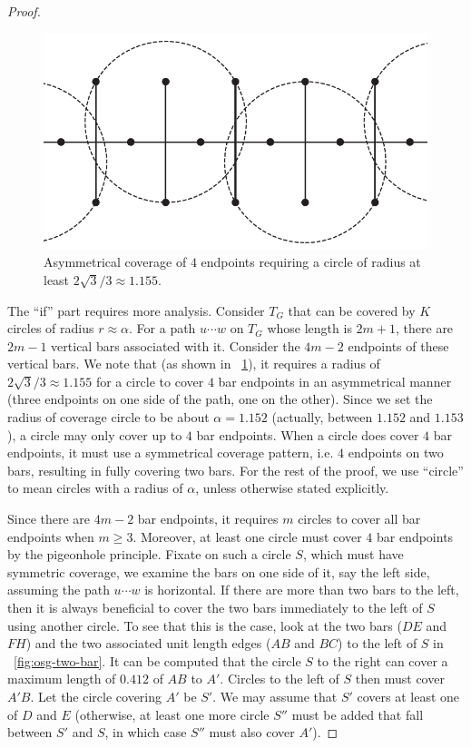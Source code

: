\begin{proof}
  \begin{figure}[!ht]
    \centering
    \includegraphics[scale=0.33]{chapters/osg/figures/edgepath3-eps-converted-to.pdf}
  \vspace*{1mm}
    \caption[Asymmetrical coverage of $4$ endpoints]{Asymmetrical coverage of $4$ endpoints requiring a circle of 
    radius at least $2\sqrt{3}/3\approx 1.155$.}
    \label{fig:osg-pathcovert}
  \end{figure}

The ``if'' part requires more analysis. Consider $T_G$ that can be covered 
by $K$ circles of radius $r \approx \alpha$. For a path $u\cdots w$ on $T_G$ whose 
length is $2m+1$, there are $2m-1$ vertical bars associated with it. Consider 
the $4m-2$ endpoints of these vertical bars. We note that (as shown in 
~\ref{fig:osg-pathcovert}), it requires a radius of $2\sqrt{3}/3\approx 1.155$ 
for a circle to cover $4$ bar endpoints in an asymmetrical manner (three endpoints
on one side of the path, one on the other). Since 
we set the radius of coverage circle to be about $\alpha = 1.152$ (actually, 
between $1.152$ and $1.153$),
a circle may only cover up to $4$ bar endpoints. When a circle does cover $4$ 
bar endpoints, it must use a symmetrical coverage pattern, i.e. $4$ endpoints
on two bars, resulting in fully covering two bars. For the 
rest of the proof, we use ``circle'' to mean circles with a radius of $\alpha$,
unless otherwise stated explicitly. 

Since there are $4m - 2$ bar endpoints, it requires $m$ circles to cover all 
bar endpoints when $m \ge 3$. Moreover, at least one circle must cover $4$ 
bar endpoints by the pigeonhole principle. Fixate on such a circle $S$, which 
must have symmetric coverage, we examine the bars on one side of it, say the 
left side, assuming the path $u\cdots w$ is horizontal. If there are more 
than two bars to the left, then it is always beneficial to cover the two bars 
immediately to the left of $S$ using another circle. To see that this is the 
case, look at the two bars ($DE$ and $FH$) and the two associated unit 
length edges ($AB$ and $BC$) to the left of $S$ in ~\ref{fig:osg-two-bar}.
It can be computed that the circle $S$ to the right can cover a maximum 
length of $0.412$ of $AB$ to $A'$. Circles to the left of $S$ then must cover 
$A'B$. Let the circle covering $A'$ be $S'$. We may assume that 
$S'$ covers at least one of $D$ and $E$ (otherwise, at least one more circle 
$S''$ must be added that fall between $S'$ and $S$, in which case $S''$ 
must also cover $A'$). 


\end{proof}
